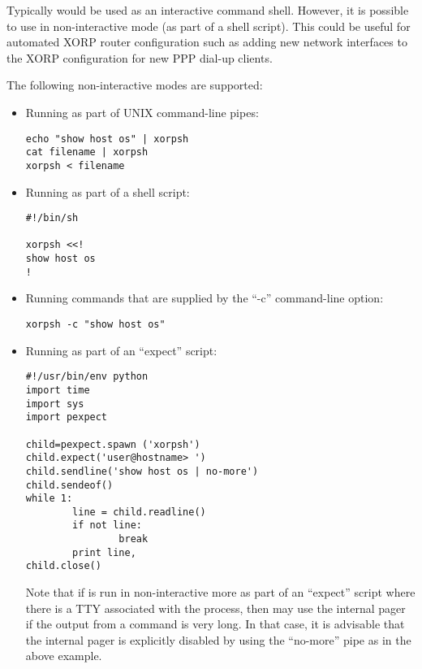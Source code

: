 Typically \xorpsh would be used as an interactive command shell.
However, it is possible to use \xorpsh in non-interactive mode
(\eg as part of a shell script). This could be useful for automated
XORP router configuration such as adding new network interfaces
to the XORP configuration for new PPP dial-up clients.

The following non-interactive modes are supported:

\begin{itemize}

  \item Running \xorpsh as part of UNIX command-line pipes:

\begin{verbatim}
echo "show host os" | xorpsh
cat filename | xorpsh
xorpsh < filename
\end{verbatim}

  \item Running \xorpsh as part of a shell script:

\begin{verbatim}
#!/bin/sh

xorpsh <<!
show host os
!
\end{verbatim}

  \item Running commands that are supplied by the ``-c'' \xorpsh
   command-line option:

\begin{verbatim}
xorpsh -c "show host os"
\end{verbatim}

  \item Running \xorpsh as part of an ``expect'' script:

\begin{verbatim}
#!/usr/bin/env python
import time
import sys
import pexpect

child=pexpect.spawn ('xorpsh')
child.expect('user@hostname> ')
child.sendline('show host os | no-more')
child.sendeof()
while 1:
        line = child.readline()
        if not line:
                break
        print line,
child.close()
\end{verbatim}

Note that if \xorpsh is run in non-interactive more as part of an ``expect''
script where there is a TTY associated with the \xorpsh process, then
\xorpsh may use the internal pager if the output from a command is very long.
In that case, it is advisable that the internal pager is explicitly disabled
by using the ``no-more'' pipe as in the above example.

\end{itemize}


